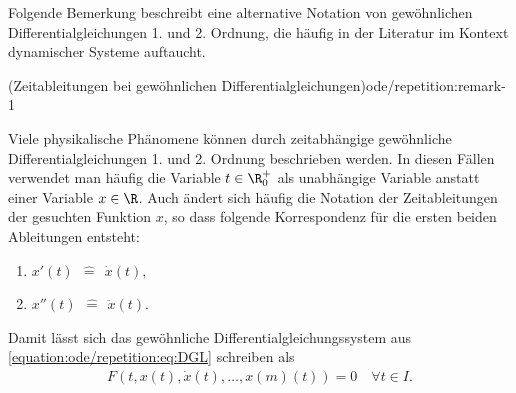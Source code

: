 \documentclass[letterpaper,10pt,english]{jupyterBook}
\begin{document}
\par
Folgende Bemerkung beschreibt eine alternative Notation von gewöhnlichen Differentialgleichungen 1. und 2. Ordnung, die häufig in der Literatur im Kontext dynamischer Systeme auftaucht.
\begin{remark}{(Zeitableitungen bei gewöhnlichen Differentialgleichungen)}{ode/repetition:remark-1}



\par
Viele physikalische Phänomene können durch zeitabhängige gewöhnliche Differentialgleichungen 1. und 2. Ordnung beschrieben werden.
In diesen Fällen verwendet man häufig die Variable \(t \in \R^+_0\) als unabhängige Variable anstatt einer Variable \(x \in \R\).
Auch ändert sich häufig die Notation der Zeitableitungen der gesuchten Funktion \(x\), so dass folgende Korrespondenz für die ersten beiden Ableitungen entsteht:
\begin{enumerate}

\item {} 
\par
\(x'(t) \ \ \hat{=} \ \ \dot{x}(t)\),

\item {} 
\par
\(x''(t) \ \ \hat{=} \ \ \ddot{x}(t)\).

\end{enumerate}

\par
Damit lässt sich das gewöhnliche Differentialgleichungssystem aus \eqref{equation:ode/repetition:eq:DGL} schreiben als
\begin{align}\label{equation:ode/repetition:eq:DGLtime}
F(t, x(t), \dot{x}(t), \ldots, x{(m)}(t)) = 0 \quad \forall t\in I.
\end{align}\end{remark}
\end{document}
